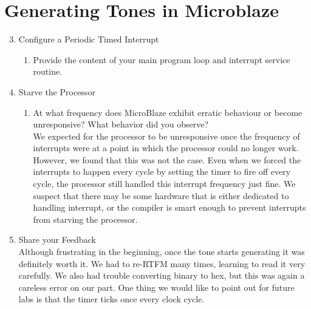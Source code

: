 \documentclass[10pt]{article}
\begin{document}
  \section*{Generating Tones in Microblaze}
    \begin{enumerate}
      \setcounter{enumi}{2}
      \item Configure a Periodic Timed Interrupt 
        \begin{enumerate}
          \item Provide the content of your main program loop and interrupt service routine.\\[1em]
          
          
        \end{enumerate}

      \item Starve the Processor
        \begin{enumerate}
          \item At what frequency does MicroBlaze exhibit erratic behaviour or become unresponsive? What behavior did you observe?\\[1em]
            We expected for the processor to be unresponsive once the frequency of interrupts were at a point in which the processor could no longer work. However, we found that this was not the case. Even when we forced the interrupts to happen every cycle by setting the timer to fire off every cycle, the processor still handled this interrupt frequency just fine. We suspect that there may be some hardware that is either dedicated to handling interrupt, or the compiler is smart enough to prevent interrupts from starving the processor.
        \end{enumerate}

      \item Share your Feedback\\[1em]
      Although frustrating in the beginning, once the tone starts generating it was definitely worth it. We had to re-RTFM many times, learning to read it very carefully. We also had trouble converting binary to hex, but this was again a careless error on our part. One thing we would like to point out for future labs is that the timer ticks once every clock cycle. 
    \end{enumerate}
\end{document}
